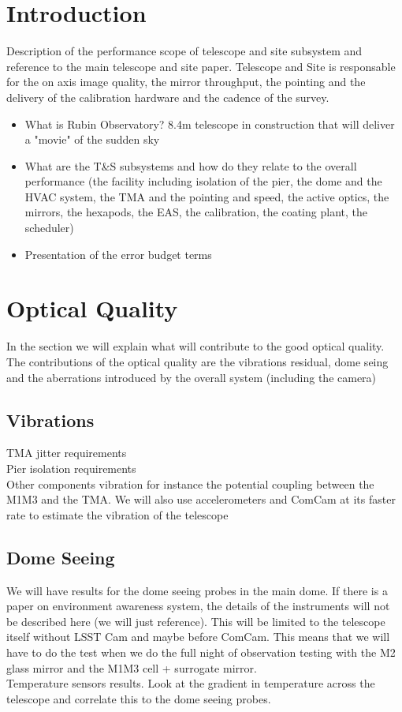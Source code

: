 \section{Introduction}

 Description of the performance scope of telescope and site subsystem and reference to the main telescope and site paper. Telescope and Site is responsable for the on axis image quality, the mirror throughput,  the pointing and the  delivery of the calibration hardware and the cadence of the survey.
\begin{itemize}
 \item  What is Rubin Observatory? 8.4m telescope in construction  that will deliver a "movie" of the sudden sky
 \item  What are the T\&S subsystems and how  do they relate to the overall performance (the facility including isolation of the pier, the dome and the HVAC system, the TMA and the pointing and speed, the active optics, the mirrors, the hexapods, the EAS, the calibration, the coating plant,  the scheduler)
 \item Presentation of the error budget terms
\end{itemize}


\section{Optical Quality} 
In the section we will explain what will contribute to the good optical quality.\\
The contributions of the optical quality are the vibrations residual, dome seing and the aberrations introduced  by the overall system (including the camera)

\subsection{Vibrations}
TMA jitter requirements\\
Pier isolation requirements\\
Other components vibration for instance the potential coupling between the M1M3 and the TMA. We will also use accelerometers and ComCam at its faster rate  to estimate the vibration of the telescope\\

\subsection{Dome Seeing}
We will have results for the dome seeing probes in the main dome. If there is a paper on environment awareness system, the details of the instruments  will not be described here (we will just reference). This will be limited to the telescope itself without LSST Cam and maybe before ComCam. This means that we will have to do the test  when we do the full night of observation testing with the M2 glass mirror and the M1M3 cell + surrogate  mirror. \\
Temperature sensors  results. Look at the gradient in temperature across the telescope  and correlate this to the dome seeing probes. 


